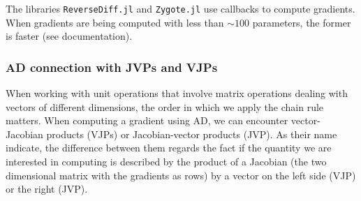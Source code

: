 The libraries \texttt{ReverseDiff.jl} and \texttt{Zygote.jl} use callbacks to compute gradients. When gradients are being computed with less than $\sim 100$ parameters, the former is faster (see documentation).




\subsubsection{AD connection with JVPs and VJPs}

When working with unit operations that involve matrix operations dealing with vectors of different dimensions, the order in which we apply the chain rule matters.
When computing a gradient using AD, we can encounter vector-Jacobian products (VJPs) or Jacobian-vector products (JVP).
As their name indicate, the difference between them regards the fact if the quantity we are interested in computing is described by the product of a Jacobian (the two dimensional matrix with the gradients as rows) by a vector on the left
side (VJP) or the right (JVP).

